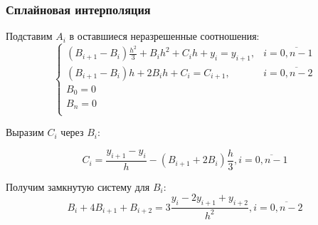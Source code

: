 \documentclass[10pt]{beamer}
\begin{document}
\begin{frame}[fragile]
\frametitle{Сплайновая интерполяция}
Подставим $A_i$ в оставшиеся неразрешенные соотношения:
$$
\begin{cases}
(B_{i+1} - B_i) \frac{h^2}{3} + B_i h^2 + C_i h + y_{i} = y_{i+1},	& i = \overline{0, n-1} \\
(B_{i+1} - B_i) h + 2 B_i  h + C_i = C_{i+1}, 						& i = \overline{0, n-2} \\
B_0 = 0 																&\\
B_n = 0 																&\\
\end{cases}
$$

Выразим $C_i$ через $B_i$:

$$
C_i = \frac{y_{i+1} - y_{i}}{h} - (B_{i+1} + 2 B_i) \frac{h}{3}, i = \overline{0, n-1}
$$ 

Получим замкнутую систему для $B_i$:
$$B_i +  4 B_{i+1} + B_{i+2} = 3 \frac{y_{i} - 2 y_{i+1} + y_{i+2}}{h^2} , i = \overline{0, n-2}$$
\end{frame}
\end{document}
